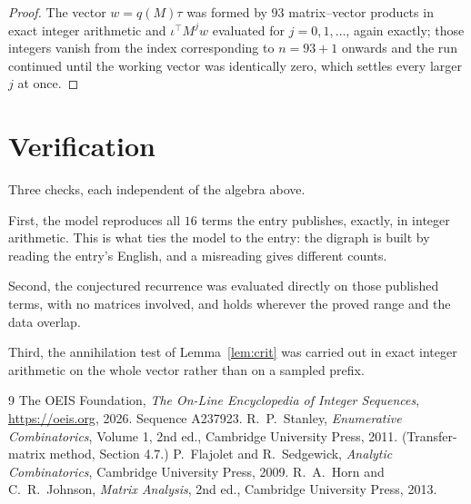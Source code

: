 \documentclass[11pt,a4paper]{article}
\theoremstyle{plain}
\theoremstyle{definition}
\begin{document}
\begin{proof}
The vector $w=q(M)\tau$ was formed by $93$ matrix--vector products in exact integer
arithmetic and $\iota^{\!\top}M^{j}w$ evaluated for $j=0,1,\dots$, again exactly; those
integers vanish from the index corresponding to $n=93+1$ onwards and the run continued
until the working vector was identically zero, which settles every larger $j$ at once.
\end{proof}

\section{Verification}

Three checks, each independent of the algebra above.

First, the model reproduces all $16$ terms the entry publishes, exactly, in integer
arithmetic. This is what ties the model to the entry: the digraph is built by reading the
entry's English, and a misreading gives different counts.

Second, the conjectured recurrence was evaluated directly on those published terms, with no
matrices involved, and holds wherever the proved range and the data overlap.

Third, the annihilation test of Lemma~\ref{lem:crit} was carried out in exact integer
arithmetic on the whole vector rather than on a sampled prefix.

\begin{thebibliography}{9}
 The OEIS Foundation, \emph{The On-Line Encyclopedia of Integer
Sequences}, \url{https://oeis.org}, 2026. Sequence A237923.
 R.~P.~Stanley, \emph{Enumerative Combinatorics}, Volume 1, 2nd ed.,
Cambridge University Press, 2011. (Transfer-matrix method, Section 4.7.)
 P.~Flajolet and R.~Sedgewick, \emph{Analytic Combinatorics}, Cambridge
University Press, 2009.
 R.~A.~Horn and C.~R.~Johnson, \emph{Matrix Analysis}, 2nd ed., Cambridge
University Press, 2013.
\end{thebibliography}
\end{document}
